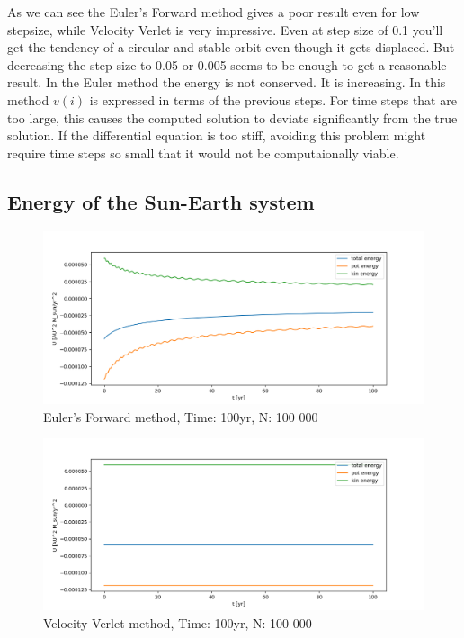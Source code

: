 \documentclass{article}
\begin{document}
As we can see the Euler's Forward method gives a poor result even for low stepsize, while Velocity Verlet is very impressive. Even at step size of 0.1 you'll get the tendency of a circular and stable orbit even though it gets displaced. But decreasing the step size to 0.05 or 0.005 seems to be enough to get a reasonable result. In the Euler method the energy is not conserved. It is increasing. In this method $v(i)$ is expressed in terms of the previous steps. For time steps that are too large, this causes the computed solution to deviate significantly from the true solution. If the differential equation is too stiff, avoiding this problem might require time steps so small that it would not be computaionally viable.
\subsection*{Energy of the Sun-Earth system}
\begin{figure}[H]
  \centering
  \includegraphics[width=1.0\textwidth]{plots/euler_energysystem100yr.png}
  \caption{Euler's Forward method, Time: 100yr, N: 100 000}
\end{figure}
\begin{figure}[H]
  \centering
  \includegraphics[width=1.0\textwidth]{plots/verlet_energysystem100yr.png}
  \caption{Velocity Verlet method, Time: 100yr, N: 100 000}
\end{figure}
\end{document}
